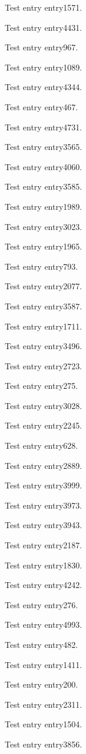 Test entry \gls{entry1571}.

Test entry \gls{entry4431}.

Test entry \gls{entry967}.

Test entry \gls{entry1089}.

Test entry \gls{entry4344}.

Test entry \gls{entry467}.

Test entry \gls{entry4731}.

Test entry \gls{entry3565}.

Test entry \gls{entry4060}.

Test entry \gls{entry3585}.

Test entry \gls{entry1989}.

Test entry \gls{entry3023}.

Test entry \gls{entry1965}.

Test entry \gls{entry793}.

Test entry \gls{entry2077}.

Test entry \gls{entry3587}.

Test entry \gls{entry1711}.

Test entry \gls{entry3496}.

Test entry \gls{entry2723}.

Test entry \gls{entry275}.

Test entry \gls{entry3028}.

Test entry \gls{entry2245}.

Test entry \gls{entry628}.

Test entry \gls{entry2889}.

Test entry \gls{entry3999}.

Test entry \gls{entry3973}.

Test entry \gls{entry3943}.

Test entry \gls{entry2187}.

Test entry \gls{entry1830}.

Test entry \gls{entry4242}.

Test entry \gls{entry276}.

Test entry \gls{entry4993}.

Test entry \gls{entry482}.

Test entry \gls{entry1411}.

Test entry \gls{entry200}.

Test entry \gls{entry2311}.

Test entry \gls{entry1504}.

Test entry \gls{entry3856}.


